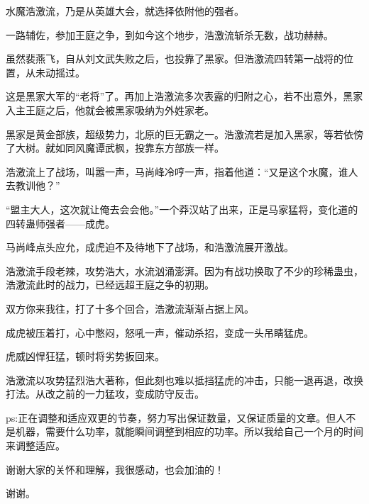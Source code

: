 \begin{this_body}
水魔浩激流，乃是从英雄大会，就选择依附他的强者。

一路辅佐，参加王庭之争，到如今这个地步，浩激流斩杀无数，战功赫赫。

虽然裴燕飞，自从刘文武失败之后，也投靠了黑家。但浩激流四转第一战将的位置，从未动摇过。

这是黑家大军的“老将”了。再加上浩激流多次表露的归附之心，若不出意外，黑家入主王庭之后，他就会被黑家吸纳为外姓家老。

黑家是黄金部族，超级势力，北原的巨无霸之一。浩激流若是加入黑家，等若依傍了大树。就如同风魔谭武枫，投靠东方部族一样。

浩激流上了战场，叫嚣一声，马尚峰冷哼一声，指着他道：“又是这个水魔，谁人去教训他？”

“盟主大人，这次就让俺去会会他。”一个莽汉站了出来，正是马家猛将，变化道的四转蛊师强者——成虎。

马尚峰点头应允，成虎迫不及待地下了战场，和浩激流展开激战。

浩激流手段老辣，攻势浩大，水流汹涌澎湃。因为有战功换取了不少的珍稀蛊虫，浩激流此时的战力，已经远超王庭之争的初期。

双方你来我往，打了十多个回合，浩激流渐渐占据上风。

成虎被压着打，心中憋闷，怒吼一声，催动杀招，变成一头吊睛猛虎。

虎威凶悍狂猛，顿时将劣势扳回来。

浩激流以攻势猛烈浩大著称，但此刻也难以抵挡猛虎的冲击，只能一退再退，改换打法。从改之前的一力猛攻，变成防守反击。

ps:正在调整和适应双更的节奏，努力写出保证数量，又保证质量的文章。但人不是机器，需要什么功率，就能瞬间调整到相应的功率。所以我给自己一个月的时间来调整适应。

谢谢大家的关怀和理解，我很感动，也会加油的！

谢谢。

\end{this_body}

